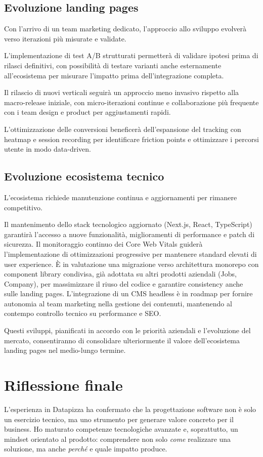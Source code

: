 \subsection{Evoluzione landing pages}

Con l'arrivo di un team marketing dedicato, l'approccio allo sviluppo evolverà 
verso iterazioni più misurate e validate.

L'implementazione di test A/B 
strutturati permetterà di validare ipotesi prima di rilasci definitivi, con 
possibilità di testare varianti anche esternamente all'ecosistema per misurare 
l'impatto prima dell'integrazione completa. 

Il rilascio di nuovi verticali 
seguirà un approccio meno invasivo rispetto alla macro-release iniziale, con 
micro-iterazioni continue e collaborazione più frequente con i team design e 
product per aggiustamenti rapidi. 

L'ottimizzazione delle conversioni beneficerà 
dell'espansione del tracking con heatmap e session recording per identificare 
friction points e ottimizzare i percorsi utente in modo data-driven.

\subsection{Evoluzione ecosistema tecnico}

L'ecosistema richiede manutenzione continua e aggiornamenti per rimanere 
competitivo.

Il mantenimento dello stack tecnologico aggiornato (Next.js, React, 
TypeScript) garantirà l'accesso a nuove funzionalità, miglioramenti di 
performance e patch di sicurezza. Il monitoraggio continuo dei Core Web Vitals 
guiderà l'implementazione di ottimizzazioni progressive per mantenere standard 
elevati di user experience. È in valutazione una migrazione verso architettura 
monorepo con component library condivisa, già adottata su altri prodotti 
aziendali (Jobs, Company), per massimizzare il riuso del codice e garantire 
consistency anche sulle landing pages. L'integrazione di un CMS headless è in 
roadmap per fornire autonomia al team marketing nella gestione dei contenuti, 
mantenendo al contempo controllo tecnico su performance e SEO.

Questi sviluppi, pianificati in accordo con le priorità aziendali e l'evoluzione 
del mercato, consentiranno di consolidare ulteriormente il valore dell'ecosistema 
landing pages nel medio-lungo termine.

\section{Riflessione finale}
L'esperienza in Datapizza ha confermato che la progettazione software non è solo
un esercizio tecnico, ma uno strumento per generare valore concreto per il business.
Ho maturato competenze tecnologiche avanzate e, soprattutto, un mindset orientato al prodotto:
comprendere non solo \textit{come} realizzare una soluzione, ma anche \textit{perché}
e quale impatto produce.


